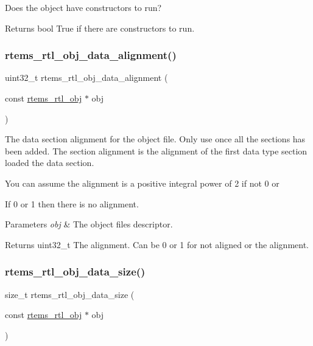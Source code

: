Does the object have constructors to run?

\begin{DoxyReturn}{Returns}
bool True if there are constructors to run. 
\end{DoxyReturn}
\mbox{\label{rtl-obj_8c_a9a3dae296e05206c99846c099789becc}} 
\subsubsection{\texorpdfstring{rtems\_rtl\_obj\_data\_alignment()}{rtems\_rtl\_obj\_data\_alignment()}}
{\footnotesize\ttfamily uint32\+\_\+t rtems\+\_\+rtl\+\_\+obj\+\_\+data\+\_\+alignment (\begin{DoxyParamCaption}\item[{const \mbox{\hyperlink{structrtems__rtl__obj}{rtems\+\_\+rtl\+\_\+obj}} $\ast$}]{obj }\end{DoxyParamCaption})}

The data section alignment for the object file. Only use once all the sections has been added. The section alignment is the alignment of the first data type section loaded the data section.

You can assume the alignment is a positive integral power of 2 if not 0 or
\begin{DoxyEnumerate}
\item If 0 or 1 then there is no alignment.
\end{DoxyEnumerate}


\begin{DoxyParams}{Parameters}
{\em obj} & The object file\textquotesingle{}s descriptor. \\
\hline
\end{DoxyParams}
\begin{DoxyReturn}{Returns}
uint32\+\_\+t The alignment. Can be 0 or 1 for not aligned or the alignment. 
\end{DoxyReturn}
\mbox{\label{rtl-obj_8c_a603ec80c7cf7d1a2f01f400b3e5c93d8}} 
\subsubsection{\texorpdfstring{rtems\_rtl\_obj\_data\_size()}{rtems\_rtl\_obj\_data\_size()}}
{\footnotesize\ttfamily size\+\_\+t rtems\+\_\+rtl\+\_\+obj\+\_\+data\+\_\+size (\begin{DoxyParamCaption}\item[{const \mbox{\hyperlink{structrtems__rtl__obj}{rtems\+\_\+rtl\+\_\+obj}} $\ast$}]{obj }\end{DoxyParamCaption})}

